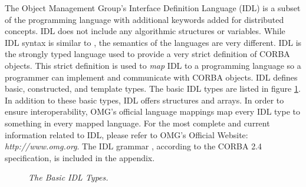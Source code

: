 

The Object Management Group's Interface Definition Language (IDL) is a 
subset of the \CPP \space programming language with additional keywords 
added for distributed concepts.  IDL does not include any algorithmic 
structures or variables.  While IDL syntax is similar to \CPP , the 
semantics of the languages are very different.  
\cite{siegel}  IDL is the strongly typed language used to 
provide a very strict definition of CORBA objects.   This strict definition 
is used to {\em{map}} IDL to a programming language so a programmer 
can implement and communicate with CORBA objects.  
IDL defines basic, constructed, and template types.  \cite{siegel}
The basic IDL types are listed in figure \ref{BasicIDLTypes}.  
In addition to these basic types, IDL offers structures and arrays.
In order to ensure interoperability, OMG's official language mappings 
map every IDL type to something in every mapped language.  \cite{siegel}
For the most complete and current information related to IDL, please 
refer to OMG's Official Website: {\em{http://www.omg.org}}. The IDL grammar 
, according to the CORBA 2$.$4 specification, is included in the appendix. 

\begin{figure}
\begin{center}
\leavevmode
\caption{\em{The Basic IDL Types}.}
\label{BasicIDLTypes}
\end{center}
\end{figure}


